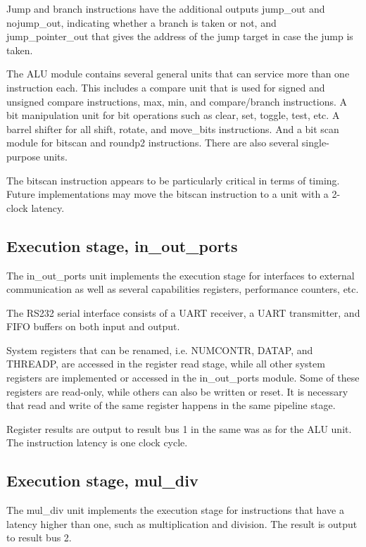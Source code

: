 \documentclass[11pt,a4paper,oneside,openright]{report}
\newcommand{\vv}{ \vspace{2mm} }   %
\begin{document}
Jump and branch instructions have the additional outputs jump\_out and nojump\_out, indicating whether a branch is taken or not, and jump\_pointer\_out that gives the address of the jump target in case the jump is taken.
\vv

The ALU module contains several general units that can service more than one instruction each. This includes a compare unit that is used for signed and unsigned compare instructions, max, min, and compare/branch instructions. A bit manipulation unit for bit operations such as clear, set, toggle, test, etc. A barrel shifter for all shift, rotate, and move\_bits instructions. And a bit scan module for bitscan and roundp2 instructions. There are also several single-purpose units.
\vv

The bitscan instruction appears to be particularly critical in terms of timing. Future implementations may move the bitscan instruction to a unit with a 2-clock latency.
\vv


\subsection{Execution stage, in\_out\_ports}
The in\_out\_ports unit implements the execution stage for interfaces to external communication as well as several capabilities registers, performance counters, etc.
\vv

The RS232 serial interface consists of a UART receiver, a UART transmitter, and FIFO buffers on both input and output.
\vv

System registers that can be renamed, i.e. NUMCONTR, DATAP, and THREADP, are accessed in the register read stage, while all other system registers are implemented or accessed in the in\_out\_ports module. Some of these registers are read-only, while others can also be written or reset. It is necessary that read and write of the same register happens in the same pipeline stage.
\vv

Register results are output to result bus 1 in the same was as for the ALU unit. The instruction latency is one clock cycle.
\vv

\subsection{Execution stage, mul\_div}
The mul\_div unit implements the execution stage for instructions that have a latency higher than one, such as multiplication and division. The result is output to result bus 2.
\vv
\end{document}
